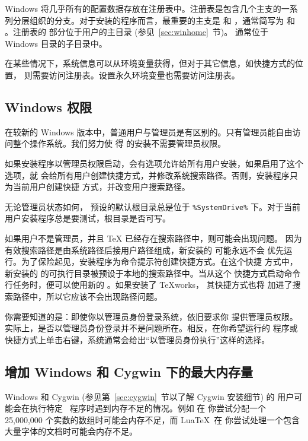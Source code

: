 \documentclass{article}
\begin{document}
Windows 将几乎所有的配置数据存放在注册表中。注册表是包含几个主支的一系
列分层组织的分支。对于安装的程序而言，最重要的主支是 
和 ，通常简写为  和 。注册表的
 部分位于用户的主目录 (参见~\ref{sec:winhome}~节)。
通常位于 Windows 目录的子目录中。

在某些情况下，系统信息可以从环境变量获得，但对于其它信息，如快捷方式的位置，
则需要访问注册表。设置永久环境变量也需要访问注册表。


\subsection{Windows 权限}
\label{sec:winpermissions}

在较新的 Windows 版本中，普通用户与管理员是有区别的。只有管理员能自由访问整个操作系统。我们努力使
得 \TL{} 的安装不需要管理员权限。

如果安装程序以管理员权限启动，会有选项允许给所有用户安装，如果启用了这个选项，就
会给所有用户创建快捷方式，并修改系统搜索路径。否则，安装程序只为当前用户创建快捷
方式，并改变用户搜索路径。

无论管理员状态如何，\TL{} 预设的默认根目录总是位于 \verb|%SystemDrive%|
下。对于当前用户安装程序总是要测试，根目录是否可写。

如果用户不是管理员，并且 \TeX{} 已经存在搜索路径中，则可能会出现问题。
因为有效搜索路径是由系统路径后接用户路径组成，新安装的 \TL{} 可能永远不会
优先运行。为了保险起见，安装程序为命令提示符创建快捷方式。在这个快捷
方式中，新安装的 \TL{} 的可执行目录被预设于本地的搜索路径中。当从这个
快捷方式启动命令行任务时，便可以使用新的 \TL{}。如果安装了 \TeX{}works，
其快捷方式也将 \TL{} 加进了搜索路径中，所以它应该不会出现路径问题。

你需要知道的是：即使你以管理员身份登录系统，依旧要求你
提供管理员权限。实际上，是否以管理员身份登录并不是问题所在。相反，在你希望运行的
程序或快捷方式上单击右键，系统通常会给出“以管理员身份执行”这样的选择。

\subsection{增加 Windows 和 Cygwin 下的最大内存量}
\label{sec:cygwin-maxmem}

Windows 和 Cygwin (参见第~\ref{sec:cygwin}~节以了解 Cygwin 安装细节) 的
用户可能会在执行特定 \TL\ 程序时遇到内存不足的情况。例如  在
你尝试分配一个 25,000,000 个实数的数组时可能会内存不足，而 Lua\TeX\ 在
你尝试处理一个包含大量字体的文档时可能会内存不足。
\end{document}
